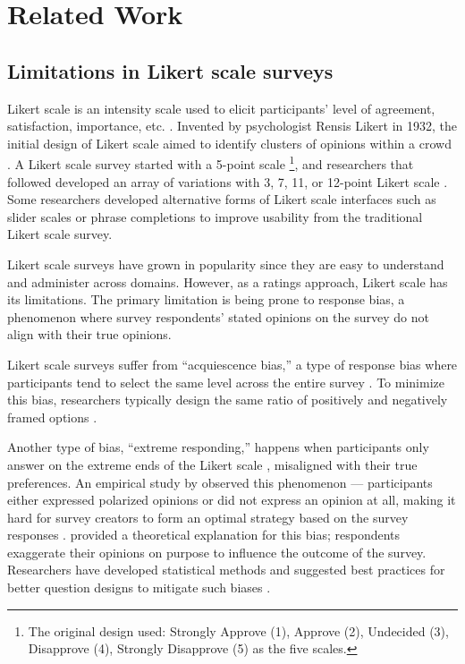 \section{Related Work} \label{related_works}

\subsection{Limitations in Likert scale surveys}
Likert scale is an intensity scale used to elicit participants' level of agreement, satisfaction, importance, etc. \cite{likert1932technique}. Invented by psychologist Rensis Likert in 1932, the initial design of Likert scale aimed to identify clusters of opinions within a crowd \cite{joshi2015likert}. A Likert scale survey started with a 5-point scale \footnote{The original design used: Strongly Approve (1), Approve (2), Undecided (3), Disapprove (4), Strongly Disapprove (5) as the five scales.}, and researchers that followed developed an array of variations with 3, 7, 11, or 12-point Likert scale \cite{garland2008computer,finstad2010}. Some researchers developed alternative forms of Likert scale interfaces such as slider scales \cite{roster2015exploring} or phrase completions \cite{hodge2003phrase} to improve usability from the traditional Likert scale survey. 

Likert scale surveys have grown in popularity since they are easy to understand and administer across domains. However, as a ratings approach, Likert scale has its limitations. The primary limitation is being prone to response bias, a phenomenon where survey respondents' stated opinions on the survey do not align with their true opinions. 

Likert scale surveys suffer from ``acquiescence bias,'' a type of response bias where participants tend to select the same level across the entire survey \cite{alwin1985measurement, moors2016two}. To minimize this bias, researchers typically design the same ratio of positively and negatively framed options \cite{kuru2016improving}. 

Another type of bias, ``extreme responding,'' happens when participants only answer on the extreme ends of the Likert scale \cite{batchelor2016extreme, furnham1986response, meisenberg2008acquiescent}, misaligned with their true preferences. An empirical study by \textcite{quarfoot2017quadratic} observed this phenomenon --- participants either expressed polarized opinions or did not express an opinion at all, making it hard for survey creators to form an optimal strategy based on the survey responses \cite{posner2018radical}. \textcite{cavaille2018towards} provided a theoretical explanation for this bias; respondents exaggerate their opinions on purpose to influence the outcome of the survey. Researchers have developed statistical methods and suggested best practices for better question designs to mitigate such biases \cite{glaser2008response}.

